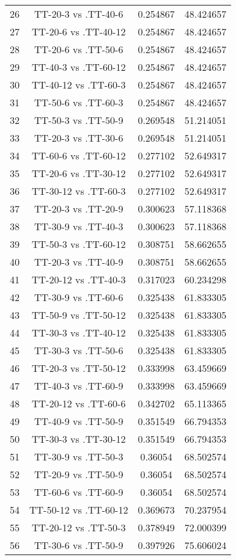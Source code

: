 \documentclass[a4paper,10pt]{article}
\begin{document}
\begin{landscape}
\begin{table}[!htp]
\begin{tabular}{cccc}
26&TT-20-3 vs .TT-40-6&0.254867&48.424657\\
27&TT-20-6 vs .TT-40-12&0.254867&48.424657\\
28&TT-20-6 vs .TT-50-6&0.254867&48.424657\\
29&TT-40-3 vs .TT-60-12&0.254867&48.424657\\
30&TT-40-12 vs .TT-60-3&0.254867&48.424657\\
31&TT-50-6 vs .TT-60-3&0.254867&48.424657\\
32&TT-50-3 vs .TT-50-9&0.269548&51.214051\\
33&TT-20-3 vs .TT-30-6&0.269548&51.214051\\
34&TT-60-6 vs .TT-60-12&0.277102&52.649317\\
35&TT-20-6 vs .TT-30-12&0.277102&52.649317\\
36&TT-30-12 vs .TT-60-3&0.277102&52.649317\\
37&TT-20-3 vs .TT-20-9&0.300623&57.118368\\
38&TT-30-9 vs .TT-40-3&0.300623&57.118368\\
39&TT-50-3 vs .TT-60-12&0.308751&58.662655\\
40&TT-20-3 vs .TT-40-9&0.308751&58.662655\\
41&TT-20-12 vs .TT-40-3&0.317023&60.234298\\
42&TT-30-9 vs .TT-60-6&0.325438&61.833305\\
43&TT-50-9 vs .TT-50-12&0.325438&61.833305\\
44&TT-30-3 vs .TT-40-12&0.325438&61.833305\\
45&TT-30-3 vs .TT-50-6&0.325438&61.833305\\
46&TT-20-3 vs .TT-50-12&0.333998&63.459669\\
47&TT-40-3 vs .TT-60-9&0.333998&63.459669\\
48&TT-20-12 vs .TT-60-6&0.342702&65.113365\\
49&TT-40-9 vs .TT-50-9&0.351549&66.794353\\
50&TT-30-3 vs .TT-30-12&0.351549&66.794353\\
51&TT-30-9 vs .TT-50-3&0.36054&68.502574\\
52&TT-20-9 vs .TT-50-9&0.36054&68.502574\\
53&TT-60-6 vs .TT-60-9&0.36054&68.502574\\
54&TT-50-12 vs .TT-60-12&0.369673&70.237954\\
55&TT-20-12 vs .TT-50-3&0.378949&72.000399\\
56&TT-30-6 vs .TT-50-9&0.397926&75.606024\\

\end{tabular}
\end{table}
\end{landscape}
\end{document}
